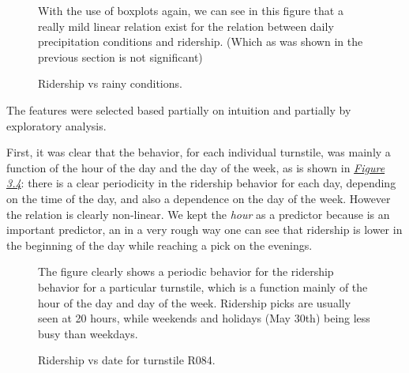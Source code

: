 \documentclass[a4paper,12pt,english]{sphinxmanual}
\begin{document}
\begin{figure}[htbp]
\centering
\capstart

\caption{Ridership vs rainy conditions.}{\small 
With the use of boxplots again, we can see in this figure that a really mild
linear relation exist for the relation between daily precipitation conditions
and ridership. (Which as was shown in the previous section is not significant)
}\label{section2:figure33}\end{figure}

The features were selected based partially on intuition and partially by exploratory
analysis.

First, it was clear that the behavior, for each individual turnstile, was mainly
a function of the hour of the day and the day of the week, as is shown in
{\hyperref[section2:figure34]{\emph{Figure 3.4}}}: there is a clear periodicity in the ridership
behavior for each day, depending on the time of the day, and also a dependence
on the day of the week. However the relation is clearly non-linear. We kept the
\emph{hour} as a predictor because is an important predictor, an in a very rough way
one can see that ridership is lower in the beginning of the day while reaching
a pick on the evenings.
\begin{figure}[htbp]
\centering
\capstart

\caption{Ridership vs date for turnstile R084.}{\small 
The figure clearly shows a periodic behavior for the ridership behavior for
a particular turnstile, which is a function mainly of the hour of the day and
day of the week. Ridership picks are usually seen at 20 hours, while weekends
and holidays (May 30th) being less busy than weekdays.
}\label{section2:figure34}\end{figure}
\end{document}
